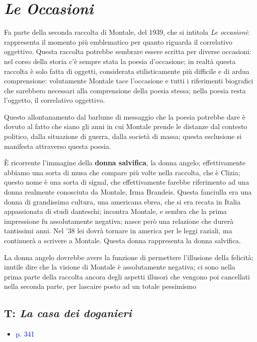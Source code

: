 \documentclass[a4paper, twoside, titlepage]{book}
\newcommand{\elenco}[1]{%
\begin{itemize}
#1
\end{itemize}}
\renewcommand{\emph}[1]{\textcolor{blue}{#1}}
\begin{document}
\section{\textit{Le Occasioni}}

Fa parte della seconda raccolta di Montale, del 1939, che si intitola \textit{Le occasioni}: rappresenta il momento più emblematico per quanto riguarda il correlativo oggettivo. Questa raccolta potrebbe sembrare essere scritta per diverse occasioni: nel corso della storia c'è sempre stata la poesia d'occasione; in realtà questa raccolta è solo fatta di oggetti, considerata stilisticamente più difficile e di ardua comprensione: volutamente Montale tace l'occasione e tutti i riferimenti biografici che sarebbero necessari alla comprensione della poesia stessa; nella poesia resta l'oggetto, il correlativo oggettivo.

Questo allontanamento dal barlume di messaggio che la poesia potrebbe dare è dovuto al fatto che siano gli anni in cui Montale prende le distanze dal contesto politico, dalla situazione di guerra, dalla società di massa; questa esclusione si manifesta attraverso questa poesia.

È ricorrente l'immagine della \textbf{donna salvifica}, la donna angelo; effettivamente abbiamo una sorta di musa che compare più volte nella raccolta, che è Clizia; questo nome è una sorta di signal, che effettivamente farebbe riferimento ad una donna realmente conosciuta da Montale, Irma Brandeis. Questa fanciulla era una donna di grandissima cultura, una americana ebrea, che si era recata in Italia appassionata di studi danteschi; incontra Montale, e sembra che la prima impressione fu assolutamente negativa; nasce però una relazione che durerà tantissimi anni. Nel '38 lei dovrà tornare in america per le leggi raziali, ma continuerà a scrivere a Montale. Questa donna rappresenta la donna salvifica.

La donna angelo dovrebbe avere la funzione di permettere l'illusione della felicità; inutile dire che la visione di Montale è assolutamente negativa; ci sono nella prima parte della raccolta ancora degli aspetti illusori che vengono poi cancellati nella seconda parte, per lascaire posto ad un totale pessimismo

\subsection{T: \textit{La casa dei doganieri}}

\elenco{\item \emph{p. 341}}
\end{document}
